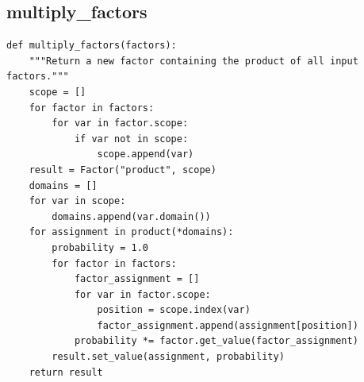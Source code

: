 \documentclass[11pt,a4paper]{article}
\begin{document}
\subsection{multiply\_factors}
\begin{lstlisting}
def multiply_factors(factors):
    """Return a new factor containing the product of all input factors."""
    scope = []
    for factor in factors:
        for var in factor.scope:
            if var not in scope:
                scope.append(var)
    result = Factor("product", scope)
    domains = []
    for var in scope:
        domains.append(var.domain())
    for assignment in product(*domains):
        probability = 1.0
        for factor in factors:
            factor_assignment = []
            for var in factor.scope:
                position = scope.index(var)
                factor_assignment.append(assignment[position])
            probability *= factor.get_value(factor_assignment)
        result.set_value(assignment, probability)
    return result
\end{lstlisting}
\end{document}

